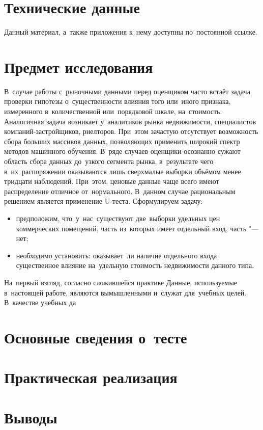 \documentclass[]{scrartcl}
\begin{document}
\section{Технические данные}
Данный материал, а~также приложения к~нему доступны по~постоянной ссылке.

\section{Предмет исследования}
В~случае работы с~рыночными данными перед оценщиком часто встаёт задача проверки гипотезы о~существенности влияния того или~иного признака, измеренного в~количественной или~порядковой шкале, на~стоимость. Аналогичная задача возникает у~аналитиков рынка недвижимости, специалистов компаний-застройщиков, риелторов. При~этом зачастую отсутствует возможность сбора больших массивов данных, позволяющих применить широкий спектр методов машинного обучения. В~ряде случаев оценщики осознанно сужают область сбора данных до~узкого сегмента рынка, в~результате чего в~их~распоряжении оказываются лишь сверхмалые выборки объёмом менее тридцати наблюдений. При~этом, ценовые данные чаще всего имеют распределение отличное от~нормального. В~данном случае рациональным решением является применение U-теста. Сформулируем задачу:
\begin{itemize}
	\item предположим, что~у~нас~существуют две~выборки удельных цен коммерческих помещений, часть из~которых имеет отдельный вход, часть "--- нет;
	\item необходимо установить: оказывает~ли наличие отдельного входа существенное влияние на~удельную стоимость недвижимости данного типа.
\end{itemize}
На~первый взгляд, согласно сложившейся практике 
Данные, используемые в~настоящей работе, являются вымышленными и~служат для~учебных целей. В~качестве учебных да
 
\section{Основные сведения о~тесте}

\section{Практическая реализация}

\section{Выводы}

\printbibliography[title=Источники информации]
\end{document}
